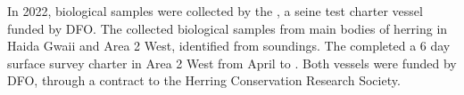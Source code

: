 In 2022, biological samples were collected by the ,
a seine test charter vessel funded by DFO.
The  collected biological samples from main bodies of herring
in Haida Gwaii and Area 2 West, identified from soundings.
The  completed a 6 day surface survey charter in Area 2 West
from April  to .
Both vessels were funded by DFO,
through a contract to the Herring Conservation Research Society.
